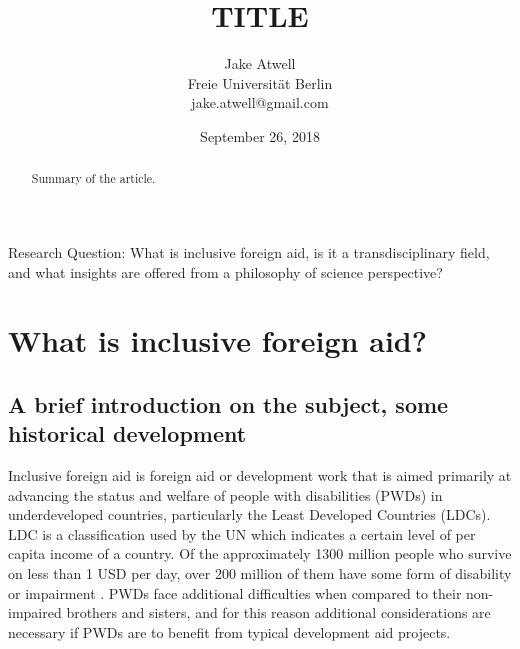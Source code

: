 \documentclass[a4paper]{article}
\begin{document}
\title{TITLE}
\author{Jake Atwell\\Freie Universität Berlin\\jake.atwell@gmail.com}
\date{September 26, 2018}

\maketitle
\newpage

\noindent Research Question: What is inclusive foreign aid, is it a
transdisciplinary field, and what insights are offered from a philosophy of
science perspective?

\tableofcontents



\begin{abstract}
Summary of the article.
\end{abstract}
\newpage




\section{What is inclusive foreign aid?}

\subsection{A brief introduction on the subject, some historical development}

Inclusive foreign aid is foreign aid or development work that is aimed
primarily at advancing the status and welfare of people with disabilities
(PWDs) in underdeveloped countries, particularly the Least Developed Countries
(LDCs). LDC is a classification used by the UN which indicates a certain level
of per capita income of a country. Of the approximately 1300 million people
who survive on less than 1 USD per day, over 200 million of them have some
form of disability or impairment \citep{chowdhury2006economics}. PWDs face
additional difficulties when compared to their non-impaired brothers and
sisters, and for this reason additional considerations are necessary if PWDs
are to benefit from typical development aid projects.
\end{document}
